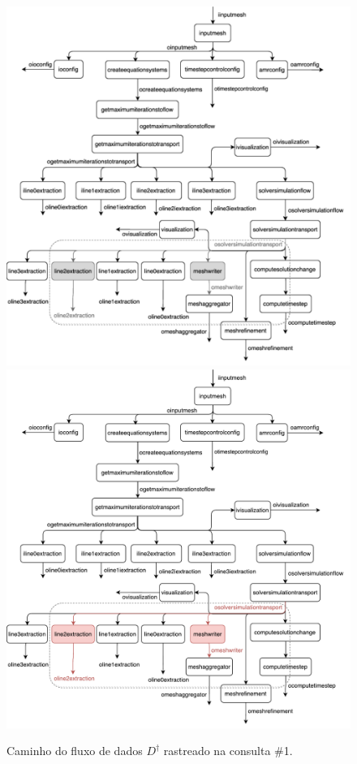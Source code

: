 \begin{figure}[htb]
    \centering
    \ifprint
    \includegraphics[width=\textwidth]{img/experiments-dataflow-1_bw}
    \else
    \includegraphics[width=\textwidth]{img/experiments-dataflow-1}
    \fi
    \caption[Caminho do fluxo de dados \(D^{\dagger}\) rastreado na consulta \#1]{Caminho do fluxo de dados \(D^{\dagger}\) rastreado na consulta \#1.}%
    \label{fig:experiments-dataflow-1}
\end{figure}

